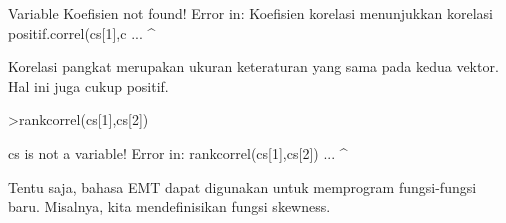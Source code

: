 \documentclass[a4paper,10pt]{article}
\begin{document}
\begin{eulernotebook}
\begin{eulercomment}
\begin{eulercomment}
\begin{eulerprompt}
\end{eulerprompt}
\begin{euleroutput}
  Variable Koefisien not found!
  Error in:
  Koefisien korelasi menunjukkan korelasi positif.correl(cs[1],c ...
            ^
\end{euleroutput}
\begin{eulercomment}
Korelasi pangkat merupakan ukuran keteraturan yang sama pada kedua
vektor. Hal ini juga cukup positif.
\end{eulercomment}
\begin{eulerprompt}
>rankcorrel(cs[1],cs[2])
\end{eulerprompt}
\begin{euleroutput}
  cs is not a variable!
  Error in:
  rankcorrel(cs[1],cs[2]) ...
                  ^
\end{euleroutput}
\begin{eulercomment}
Tentu saja, bahasa EMT dapat digunakan untuk memprogram fungsi-fungsi
baru. Misalnya, kita mendefinisikan fungsi skewness.


\end{eulercomment}
\end{eulercomment}
\end{eulercomment}
\end{eulernotebook}
\end{document}
